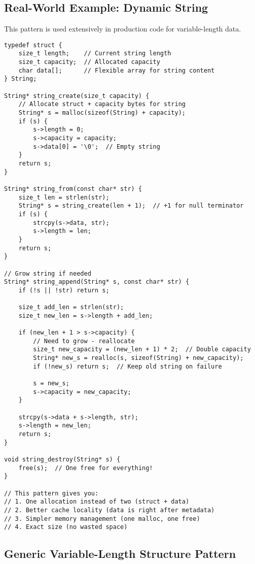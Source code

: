 \subsection{Real-World Example: Dynamic String}

This pattern is used extensively in production code for variable-length data.

\begin{lstlisting}
typedef struct {
    size_t length;    // Current string length
    size_t capacity;  // Allocated capacity
    char data[];      // Flexible array for string content
} String;

String* string_create(size_t capacity) {
    // Allocate struct + capacity bytes for string
    String* s = malloc(sizeof(String) + capacity);
    if (s) {
        s->length = 0;
        s->capacity = capacity;
        s->data[0] = '\0';  // Empty string
    }
    return s;
}

String* string_from(const char* str) {
    size_t len = strlen(str);
    String* s = string_create(len + 1);  // +1 for null terminator
    if (s) {
        strcpy(s->data, str);
        s->length = len;
    }
    return s;
}

// Grow string if needed
String* string_append(String* s, const char* str) {
    if (!s || !str) return s;

    size_t add_len = strlen(str);
    size_t new_len = s->length + add_len;

    if (new_len + 1 > s->capacity) {
        // Need to grow - reallocate
        size_t new_capacity = (new_len + 1) * 2;  // Double capacity
        String* new_s = realloc(s, sizeof(String) + new_capacity);
        if (!new_s) return s;  // Keep old string on failure

        s = new_s;
        s->capacity = new_capacity;
    }

    strcpy(s->data + s->length, str);
    s->length = new_len;
    return s;
}

void string_destroy(String* s) {
    free(s);  // One free for everything!
}

// This pattern gives you:
// 1. One allocation instead of two (struct + data)
// 2. Better cache locality (data is right after metadata)
// 3. Simpler memory management (one malloc, one free)
// 4. Exact size (no wasted space)
\end{lstlisting}

\subsection{Generic Variable-Length Structure Pattern}


